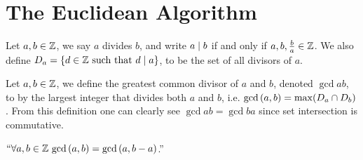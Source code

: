     \section{The Euclidean Algorithm}
        \begin{definition}
            Let $a, b \in \mathbb{Z}$, we say $a$ divides $b$, and write $a \mid b$ 
            if and only if $a, b, \frac{b}{a} \in \mathbb{Z}$. We also define 
            $D_a = \left\{d \in \mathbb{Z} \mbox{ such that } d \mid a\right\}$,
            to be the set of all divisors of $a$.
        \end{definition}
        \begin{definition}
            Let $a, b \in \mathbb{Z}$, we define the greatest common divisor of $a$ and $b$, 
            denoted $\gcd{a}{b}$, to by the largest integer that divides both $a$ and $b$, 
            i.e. $\mathrm{gcd}\left(a, b\right) = \max(D_a \cap D_b)$. From this definition one can clearly
            see $\gcd{a}{b} = \gcd{b}{a}$ since set intersection is commutative.
        \end{definition}
        \begin{theorem}
            $``\forall a, b \in \mathbb{Z} \ \mathrm{gcd}\left(a, b\right) = \mathrm{gcd}\left(a, b - a\right)$.''
            \label{EA Basis}
        \end{theorem}
